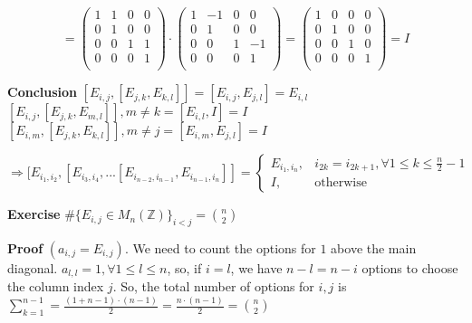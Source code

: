 \documentclass[12pt]{article}
\begin{document}
$$=\begin{pmatrix} 
	1 & 1 & 0 & 0 \\
	0 & 1 & 0 & 0 \\
	0 & 0 & 1 & 1 \\
	0 & 0 & 0 & 1 \\
	\end{pmatrix} \cdot \begin{pmatrix} 
	1 & -1 & 0 & 0 \\
	0 & 1 & 0 & 0 \\
	0 & 0 & 1 & -1 \\
	0 & 0 & 0 & 1 \\
	\end{pmatrix}=\begin{pmatrix} 
	1 & 0 & 0 & 0 \\
	0 & 1 & 0 & 0 \\
	0 & 0 & 1 & 0 \\
	0 & 0 & 0 & 1 \\
\end{pmatrix}=I$$

\textbf{Conclusion} \newline
\( [E_{i,j},[E_{j,k},E_{k,l}]]=[E_{i,j},E_{j,l}]=E_{i,l} \) \newline
\( [E_{i,j},[E_{j,k},E_{m,l}]], m \neq k=[E_{i,l},I]=I \) \newline
\( [E_{i,m},[E_{j,k},E_{k,l}]], m \neq j=[E_{i,m},E_{j,l}]=I \) \newline

\( \Rightarrow [E_{i_{1},i_{2}},[E_{i_{3},i_{4}},...[E_{i_{n-2},i_{n-1}},E_{i_{n-1},i_{n}}]]=
\begin{cases}
    E_{i_{1},i_{n}},& i_{2k}=i_{2k+1},\forall 1 \leq k \leq \frac{n}{2}-1\\
    I,              & \text{otherwise}
\end{cases}
\)

\textbf{Exercise} \newline
\( \#\{ E_{i,j} \in M_{n}(\mathbb{Z}) \}_{i<j}={n \choose 2} \) \newline

\textbf{Proof} \newline
\( (a_{i,j}=E_{i,j}) \). We need to count the options for \( 1 \) above the main diagonal. \newline
\( a_{l,l}=1, \forall 1 \leq l \leq n \), so, if \( i=l \), we have \( n-l=n-i \) options to choose the column index \( j \). \newline
So, the total number of options for \( i,j \) is \( \sum_{k=1}^{n-1}=\frac{(1 + n-1) \cdot (n-1)}{2}=\frac{n \cdot (n-1)}{2}={n \choose 2} \) \newline
\end{document}
